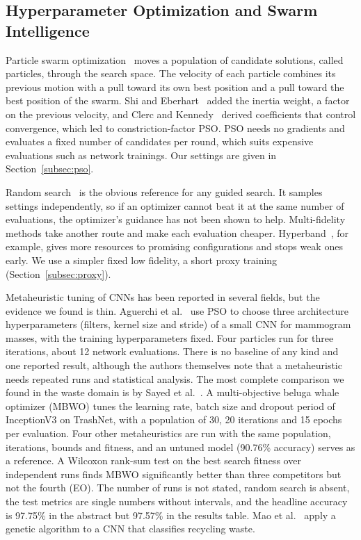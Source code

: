 \subsection{Hyperparameter Optimization and Swarm Intelligence}
\label{subsec:rw-hpo}

Particle swarm optimization~\cite{kennedy1995particle} moves a population of candidate solutions, called particles, through the search space. The velocity of each particle combines its previous motion with a pull toward its own best position and a pull toward the best position of the swarm. Shi and Eberhart~\cite{shi1998modified} added the inertia weight, a factor on the previous velocity, and Clerc and Kennedy~\cite{clerc2002particle} derived coefficients that control convergence, which led to constriction-factor PSO. PSO needs no gradients and evaluates a fixed number of candidates per round, which suits expensive evaluations such as network trainings. Our settings are given in Section~\ref{subsec:pso}.

Random search~\cite{bergstra2012random} is the obvious reference for any guided search. It samples settings independently, so if an optimizer cannot beat it at the same number of evaluations, the optimizer's guidance has not been shown to help. Multi-fidelity methods take another route and make each evaluation cheaper. Hyperband~\cite{li2018hyperband}, for example, gives more resources to promising configurations and stops weak ones early. We use a simpler fixed low fidelity, a short proxy training (Section~\ref{subsec:proxy}).

Metaheuristic tuning of CNNs has been reported in several fields, but the evidence we found is thin. Aguerchi et al.~\cite{aguerchi2024cnn} use PSO to choose three architecture hyperparameters (filters, kernel size and stride) of a small CNN for mammogram masses, with the training hyperparameters fixed. Four particles run for three iterations, about 12 network evaluations. There is no baseline of any kind and one reported result, although the authors themselves note that a metaheuristic needs repeated runs and statistical analysis. The most complete comparison we found in the waste domain is by Sayed et al.~\cite{sayed2024intelligent}. A multi-objective beluga whale optimizer (MBWO) tunes the learning rate, batch size and dropout period of InceptionV3 on TrashNet, with a population of 30, 20 iterations and 15 epochs per evaluation. Four other metaheuristics are run with the same population, iterations, bounds and fitness, and an untuned model (90.76\% accuracy) serves as a reference. A Wilcoxon rank-sum test on the best search fitness over independent runs finds MBWO significantly better than three competitors but not the fourth (EO). The number of runs is not stated, random search is absent, the test metrics are single numbers without intervals, and the headline accuracy is 97.75\% in the abstract but 97.57\% in the results table. Mao et al.~\cite{mao2021recycling} apply a genetic algorithm to a CNN that classifies recycling waste.

